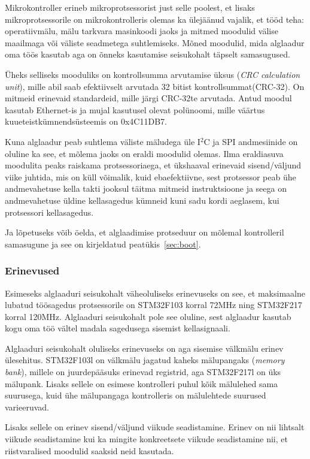 \documentclass[12pt,a4paper]{article}
\newcommand{\iic}{I${}^2$C }
\begin{document}
Mikrokontroller erineb mikroprotsessorist just selle poolest, et lisaks
mikroprotsessorile on mikrokontrolleris olemas ka ülejäänud vajalik, et tööd
teha: operatiivmälu, mälu tarkvara masinkoodi jaoks ja mitmed moodulid välise
maailmaga või väliste seadmetega suhtlemiseks. Mõned moodulid, mida alglaadur
oma töös kasutab aga on õnneks kasutamise seisukohalt täpselt samasugused.

Üheks selliseks mooduliks on kontrollsumma arvutamise üksus (\textit{CRC
calculation unit}), mille abil saab efektiivselt arvutada 32 bitist
kontrollsummat(CRC-32). On mitmeid erinevaid standardeid, mille järgi CRC-32te
arvutada. Antud moodul kasutab Ethernet-is ja mujal kasutusel olevat polünoomi,
mille väärtus kuueteistkümnendsüsteemis on 0x4C11DB7. 

Kuna alglaadur peab suhtlema väliste mäludega üle \iic ja SPI andmesiinide on
oluline ka see, et mõlema jaoks on eraldi moodulid olemas. Ilma eraldiasuva
moodulita peaks raiskama protsessoriaega, et ükshaaval erinevaid sisend/väljund
viike juhtida, mis on küll võimalik, kuid ebaefektiivne, sest protsessor peab
ühe andmevahetuse kella takti jooksul täitma mitmeid instruktsioone ja seega
on andmevahetuse üldine kellasagedus kümneid kuni sadu kordi aeglasem, kui
protsessori kellasagedus.

Ja lõpetuseks võib öelda, et alglaadimise protseduur on mõlemal kontrolleril
samasugune ja see on kirjeldatud peatükis~\ref{sec:boot}.

\subsubsection{Erinevused}
Esimeseks alglaaduri seisukohalt väheoluliseks erinevuseks on see, et
maksimaalne lubatud töösagedus protsessorile on STM32F103 korral 72MHz ning
STM32F217 korral 120MHz. Alglaaduri seisukohalt pole see oluline, sest alglaadur
kasutab kogu oma töö vältel madala sagedusega sisemist kellasignaali.

Alglaaduri seisukohalt oluliseks erinevuseks on aga sisemise välkmälu erinev
ülesehitus. STM32F103l on välkmälu jagatud kaheks mälupangaks (\textit{memory
bank}), millele on juurdepääsuks erinevad registrid, aga STM32F217l on üks
mälupank. Lisaks sellele on esimese kontrolleri puhul kõik mälulehed sama
suurusega, kuid ühe mälupangaga kontrolleris on mälulehtede suurused
varieeruvad. \cite{f1fpm,f2fpm}

Lisaks sellele on erinev sisend/väljund viikude seadistamine. Erinev on nii
lihtsalt viikude seadistamine kui ka mingite konkreetsete viikude seadistamine
nii, et riistvaralised moodulid saaksid neid kasutada.
\end{document}
